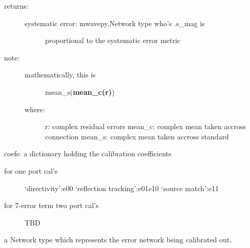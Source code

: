 \documentclass[letterpaper,10pt,english]{sphinxmanual}
\begin{document}
\begin{fulllineitems}
\begin{fulllineitems}
\begin{description}
\begin{description}
\end{description}

\item[{returns:}] \leavevmode\begin{description}
\item[{systematic error: mwavepy.Network type who's .s\_mag is }] \leavevmode
proportional to the systematic error metric

\end{description}

\item[{note:}] \leavevmode\begin{description}
\item[{mathematically, this is }] \leavevmode
mean\_s({\color{red}\bfseries{}\textbar{}mean\_c(r)\textbar{}})

\item[{where:}] \leavevmode
r: complex residual errors
mean\_c: complex mean taken accross connection
mean\_s: complex mean taken accross standard

\end{description}

\end{description}

\end{fulllineitems}


\begin{fulllineitems}
\label{api/mwavepy.calibration:mwavepy.calibration.calibration.Calibration.coefs}
coefs: a dictionary holding the calibration coefficients
\begin{description}
\item[{for one port cal's}] \leavevmode
`directivity':e00
`reflection tracking':e01e10
`source match':e11

\item[{for 7-error term two port cal's}] \leavevmode
TBD

\end{description}

\end{fulllineitems}


\begin{fulllineitems}
\label{api/mwavepy.calibration:mwavepy.calibration.calibration.Calibration.error_ntwk}
a Network type which represents the error network being
calibrated out.


\end{fulllineitems}
\end{fulllineitems}
\end{document}
